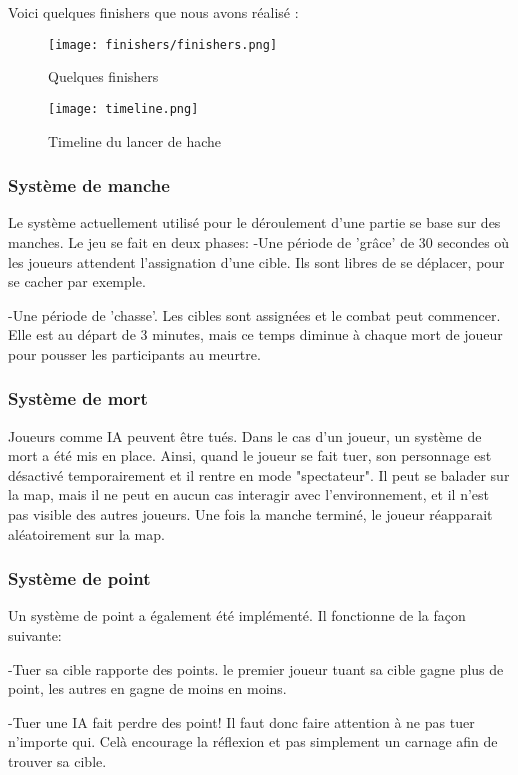 Voici quelques finishers que nous avons réalisé :

\begin{figure}[hbt!]
    \centering
    \texttt{[image: finishers/finishers.png]}
    \caption{Quelques finishers}
\end{figure}

\FloatBarrier
\begin{figure}[hbt!]
    \centering
    \texttt{[image: timeline.png]}
    \caption{Timeline du lancer de hache}
\end{figure}


\subsubsection{Système de manche}
    Le système actuellement utilisé pour le déroulement d'une partie se base sur des manches. Le jeu se fait en deux phases:
    	-Une période de 'grâce' de 30 secondes où les joueurs attendent l'assignation d'une cible. 
	 Ils sont libres de se déplacer, pour se cacher par exemple.

	-Une période de 'chasse'. Les cibles sont assignées et le combat peut commencer. Elle est au départ de 3 minutes, mais ce temps
	 diminue à chaque mort de joueur pour pousser les participants au meurtre.

\subsubsection{Système de mort}
    Joueurs comme IA peuvent être tués. Dans le cas d'un joueur, un système de mort a été mis en place. Ainsi,
    quand le joueur se fait tuer, son personnage est désactivé temporairement et il rentre
    en mode "spectateur". Il peut se balader sur la map, mais il ne peut en aucun cas interagir avec l'environnement,
    et il n'est pas visible des autres joueurs. Une fois la manche terminé, le joueur réapparait aléatoirement sur la map.

\subsubsection{Système de point}
    Un système de point a également été implémenté. Il fonctionne de la façon suivante:
    
	-Tuer sa cible rapporte des points. le premier joueur tuant sa cible gagne plus de point, les autres en gagne de moins en moins.
	
	-Tuer une IA fait perdre des point! Il faut donc faire attention à ne pas tuer n'importe qui. Celà encourage la réflexion et pas simplement un carnage afin de trouver sa cible.
	
